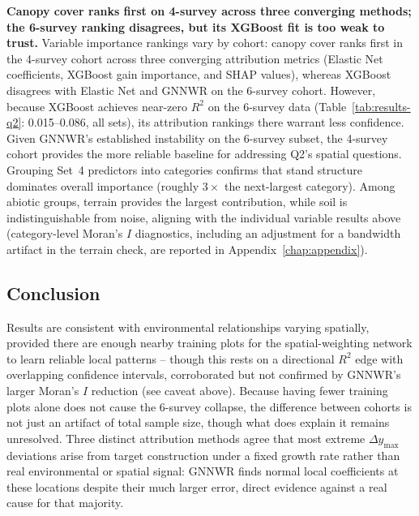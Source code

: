 \documentclass[logo,msc,ai]{infthesis}           %
\begin{document}
\textbf{Canopy cover ranks first on 4-survey across three converging methods; the 6-survey ranking disagrees, but its XGBoost fit is too weak to trust.}
Variable importance rankings vary by cohort: canopy cover ranks first in the 4-survey cohort across three converging attribution metrics (Elastic Net coefficients, XGBoost gain importance, and SHAP values), whereas XGBoost disagrees with Elastic Net and GNNWR on the 6-survey cohort. However, because XGBoost achieves near-zero $R^2$ on the 6-survey data (Table~\ref{tab:results-q2}: 0.015--0.086, all sets), its attribution rankings there warrant less confidence. Given GNNWR's established instability on the 6-survey subset, the 4-survey cohort provides the more reliable baseline for addressing Q2's spatial questions. Grouping Set~4 predictors into categories confirms that stand structure dominates overall importance (roughly $3\times$ the next-largest category). Among abiotic groups, terrain provides the largest contribution, while soil is indistinguishable from noise, aligning with the individual variable results above (category-level Moran's $I$ diagnostics, including an adjustment for a bandwidth artifact in the terrain check, are reported in Appendix~\ref{chap:appendix}).

\subsection*{Conclusion}
Results are consistent with environmental relationships varying spatially, provided there are enough nearby training plots for the spatial-weighting network to learn reliable local patterns -- though this rests on a directional $R^2$ edge with overlapping confidence intervals, corroborated but not confirmed by GNNWR's larger Moran's $I$ reduction (see caveat above). Because having fewer training plots alone does not cause the 6-survey collapse, the difference between cohorts is not just an artifact of total sample size, though what does explain it remains unresolved. Three distinct attribution methods agree that most extreme $\Delta y_{\max}$ deviations arise from target construction under a fixed growth rate rather than real environmental or spatial signal: GNNWR finds normal local coefficients at these locations despite their much larger error, direct evidence against a real cause for that majority.
\end{document}
